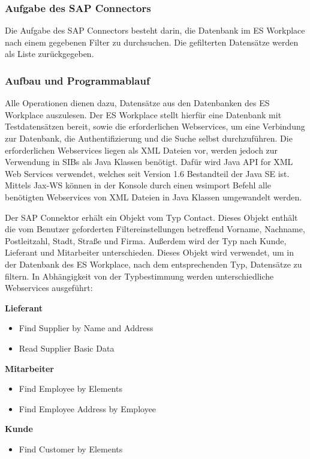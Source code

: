 \subsubsection{Aufgabe des SAP Connectors}

Die Aufgabe des SAP Connectors besteht darin, die Datenbank im ES Workplace nach einem 
gegebenen Filter zu durchsuchen. Die gefilterten Datensätze werden als Liste zurückgegeben. 

\subsubsection{Aufbau und Programmablauf}

Alle Operationen dienen dazu, Datensätze aus den Datenbanken des ES Workplace auszulesen. Der ES Workplace stellt hierfür 
eine Datenbank mit Testdatensätzen bereit, sowie die erforderlichen Webservices, um eine Verbindung zur Datenbank, 
die Authentifizierung und die Suche selbst durchzuführen. Die erforderlichen Webservices liegen als XML Dateien vor, werden 
jedoch zur Verwendung in SIBs als Java Klassen benötigt. Dafür wird Java API for XML Web Services verwendet, welches seit
Version 1.6  Bestandteil der Java SE ist. Mittels Jax-WS können in der Konsole durch einen wsimport Befehl alle benötigten 
Webservices von XML Dateien in Java Klassen umgewandelt werden. 

Der SAP Connektor erhält ein Objekt vom Typ Contact. Dieses Objekt enthält die vom Benutzer geforderten Filtereinstellungen 
betreffend Vorname, Nachname, Postleitzahl, Stadt, Straße und Firma. Außerdem wird der Typ nach Kunde, Lieferant und 
Mitarbeiter unterschieden. Dieses Objekt wird verwendet, um in der Datenbank des ES Workplace, nach dem entsprechenden Typ,
Datensätze zu filtern. In Abhängigkeit von der Typbestimmung werden unterschiedliche Webservices ausgeführt:

\textbf{Lieferant}
\begin{itemize}
\item Find Supplier by Name and Address
\item Read Supplier Basic Data 
\end{itemize}

\textbf{Mitarbeiter}
\begin{itemize}
\item Find Employee by Elements
\item Find Employee Address by Employee
\end{itemize}

\textbf{Kunde}
\begin{itemize}
\item Find Customer by Elements
\end{itemize}

